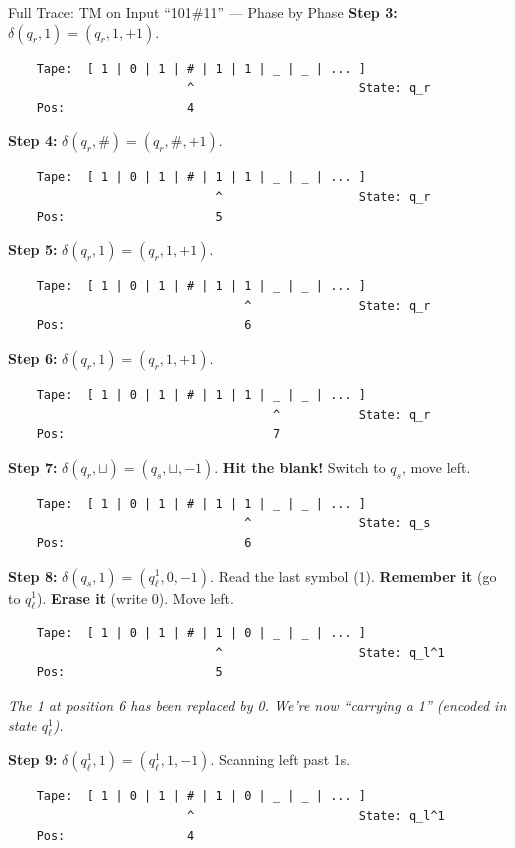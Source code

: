 \documentclass[11pt,a4paper]{article}
\begin{document}
\begin{examplebox}{Full Trace: TM on Input ``101\#11'' --- Phase by Phase}
\textbf{Step 3:} $\delta(q_r, 1) = (q_r, 1, +1)$.
\begin{lstlisting}
    Tape:  [ 1 | 0 | 1 | # | 1 | 1 | _ | _ | ... ]
                         ^                       State: q_r
    Pos:                 4
\end{lstlisting}

\textbf{Step 4:} $\delta(q_r, \#) = (q_r, \#, +1)$.
\begin{lstlisting}
    Tape:  [ 1 | 0 | 1 | # | 1 | 1 | _ | _ | ... ]
                             ^                   State: q_r
    Pos:                     5
\end{lstlisting}

\textbf{Step 5:} $\delta(q_r, 1) = (q_r, 1, +1)$.
\begin{lstlisting}
    Tape:  [ 1 | 0 | 1 | # | 1 | 1 | _ | _ | ... ]
                                 ^               State: q_r
    Pos:                         6
\end{lstlisting}

\textbf{Step 6:} $\delta(q_r, 1) = (q_r, 1, +1)$.
\begin{lstlisting}
    Tape:  [ 1 | 0 | 1 | # | 1 | 1 | _ | _ | ... ]
                                     ^           State: q_r
    Pos:                             7
\end{lstlisting}

\textbf{Step 7:} $\delta(q_r, \sqcup) = (q_s, \sqcup, -1)$. \textbf{Hit the blank!} Switch to $q_s$, move left.
\begin{lstlisting}
    Tape:  [ 1 | 0 | 1 | # | 1 | 1 | _ | _ | ... ]
                                 ^               State: q_s
    Pos:                         6
\end{lstlisting}

\textbf{Step 8:} $\delta(q_s, 1) = (q_\ell^1, 0, -1)$. Read the last symbol (1). \textbf{Remember it} (go to $q_\ell^1$). \textbf{Erase it} (write 0). Move left.
\begin{lstlisting}
    Tape:  [ 1 | 0 | 1 | # | 1 | 0 | _ | _ | ... ]
                             ^                   State: q_l^1
    Pos:                     5
\end{lstlisting}
\textit{The 1 at position 6 has been replaced by 0. We're now ``carrying a 1'' (encoded in state $q_\ell^1$).}

\textbf{Step 9:} $\delta(q_\ell^1, 1) = (q_\ell^1, 1, -1)$. Scanning left past 1s.
\begin{lstlisting}
    Tape:  [ 1 | 0 | 1 | # | 1 | 0 | _ | _ | ... ]
                         ^                       State: q_l^1
    Pos:                 4
\end{lstlisting}


\end{examplebox}
\end{document}
